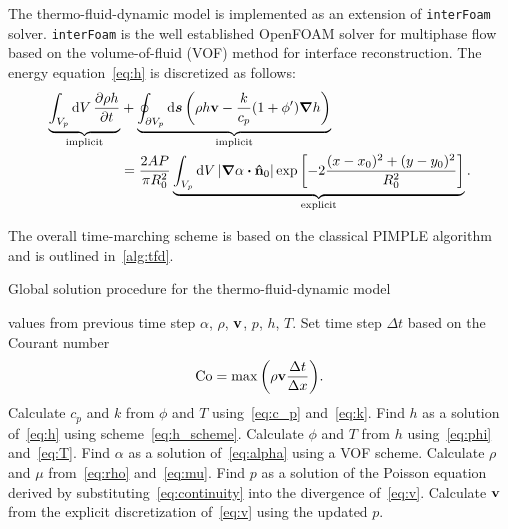 \documentclass{article}
\newcommand{\OpenFOAM}{OpenFOAM\textregistered\xspace}
\newcommand{\bv}{\vb{v}}
\newcommand{\bn}{\vu{n}}
\newcommand{\intCell}{\int_{V_p} \dd{V}}
\newcommand{\intFaces}{\oint_{\partial V_p} \dd{\vb*{s}}}
\begin{document}
The thermo-fluid-dynamic model is implemented as an extension of \verb+interFoam+ solver.
\verb+interFoam+ is the well established \OpenFOAM solver for multiphase flow
based on the volume-of-fluid (VOF) method for interface reconstruction.
The energy equation~\eqref{eq:h} is discretized as follows:
\begin{equation}\label{eq:h_scheme}
    \begin{aligned}
    \underbrace{
        \intCell \pdv{\rho h}{t}
    }_\text{implicit} &+ \underbrace{
        \intFaces \qty(\rho h\bv - \frac{k}{c_p}(1+\phi')\grad{h})
    }_\text{implicit} \\ &= \frac{2AP}{\pi R_0^2}\underbrace{
        \intCell |\grad\alpha\vdot\bn_0|\exp\qty[-2\frac{(x-x_0)^2 + (y-y_0)^2}{R_0^2}]
    }_\text{explicit}.
    \end{aligned}
\end{equation}

The overall time-marching scheme is based on the classical PIMPLE algorithm
and is outlined in~\ref{alg:tfd}.

\begin{algorithm}[H]
\caption{Global solution procedure for the thermo-fluid-dynamic model}\label{alg:tfd}
\begin{algorithmic}[1]
    \Require values from previous time step $\alpha$, $\rho$, $\bv$, $p$, $h$, $T$.
    \State Set time step $\Delta{t}$ based on the Courant number
    \begin{equation}\label{eq:Courant}
        \mathrm{Co} = \max\qty( \rho\bv\frac{\Delta t}{\Delta x} ).
    \end{equation}
    \State Calculate $c_p$ and $k$ from $\phi$ and $T$ using~\eqref{eq:c_p} and~\eqref{eq:k}.
    \State Find $h$ as a solution of~\eqref{eq:h} using scheme~\eqref{eq:h_scheme}.
    \State Calculate $\phi$ and $T$ from $h$ using~\eqref{eq:phi} and~\eqref{eq:T}.
        \State Find $\alpha$ as a solution of~\eqref{eq:alpha} using a VOF scheme.
        \State Calculate $\rho$ and $\mu$ from~\eqref{eq:rho} and~\eqref{eq:mu}.
            \State Find $p$ as a solution of the Poisson equation derived by substituting~\eqref{eq:continuity}
            into the divergence of~\eqref{eq:v}.
            \State Calculate $\bv$ from the explicit discretization of~\eqref{eq:v} using the updated $p$.
        \EndWhile
    \EndWhile
\end{algorithmic}
\end{algorithm}
\end{document}
